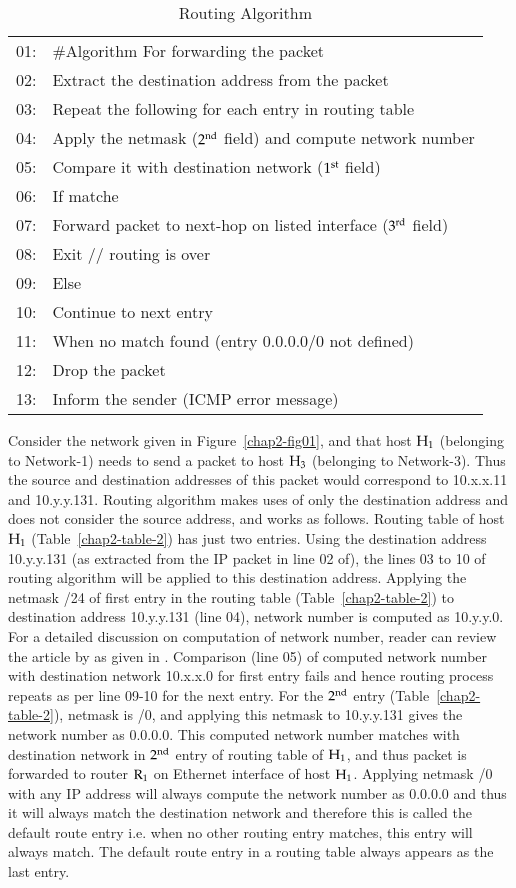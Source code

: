 \begin{multicols}{2}
\begin{table}[H]
\caption{Routing Algorithm}\label{chap2-table-3}
\begin{tabular}{|cl|}
\hline
01: &  \#Algorithm For forwarding the packet\\
02: & Extract the destination address from the packet\\
03: & Repeat the following for each entry in routing table\\
04: & Apply the netmask ($2^{\rm nd}$ field) and compute network number\\
05: & Compare it with destination network ($1^{\rm st}$ field)\\
06: & If matche\\
07: & Forward packet to next-hop on listed interface ($3^{\rm rd}$ field)\\
08: & Exit // routing is over\\
09: & Else\\
10: & Continue to next entry\\
11: & When no match found (entry 0.0.0.0/0 not defined)\\
12: & Drop the packet\\
13: & Inform the sender (ICMP error message)\\
\hline
\end{tabular}
\end{table}

Consider the network given in Figure~\ref{chap2-fig01}, and that host ${\rm H}_{1}$ (belonging to Network-1) needs to send a packet to host ${\rm H}_{3}$ (belonging to Network-3). Thus the source and destination addresses of this packet would correspond to 10.x.x.11 and 10.y.y.131. Routing algorithm makes uses of only the destination address and does not consider the source address, and works as follows. Routing table of host ${\rm H}_{1}$ (Table~\ref{chap2-table-2}) has just two entries. Using the destination address 10.y.y.131 (as extracted from the IP packet in line 02 of), the lines 03 to 10 of routing algorithm will be applied to this destination address. Applying the netmask /24 of first entry in the routing table (Table~\ref{chap2-table-2}) to destination address 10.y.y.131 (line 04), network number is computed as 10.y.y.0. For a detailed discussion on computation of network number, reader can review the article by as given in \cite{art2-key01}. Comparison (line 05) of computed network number with destination network 10.x.x.0 for first entry fails and hence routing process repeats as per line 09-10 for the next entry. For the $2^{\rm nd}$ entry (Table~\ref{chap2-table-2}), netmask is /0, and applying this netmask to 10.y.y.131 gives the network number as 0.0.0.0. This computed network number matches with destination network in $2^{\rm nd}$ entry of routing table of ${\rm H}_{1}$, and thus packet is forwarded to router ${\rm R}_{1}$ on Ethernet interface of host ${\rm H}_{1}$. Applying netmask /0 with any IP address will always compute the network number as 0.0.0.0 and thus it will always match the destination network and therefore this is called the default route entry i.e. when no other routing entry matches, this entry will always match. The default route entry in a routing table always appears as the last entry.


\end{multicols}
